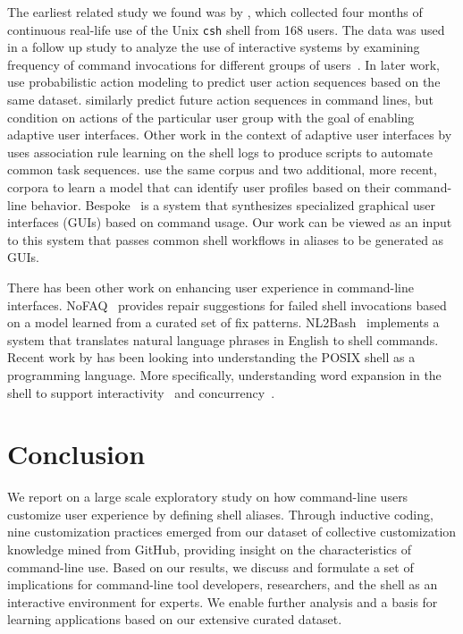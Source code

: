 \documentclass[smallextended,natbib]{svjour3}
\begin{document}
The earliest related study we found was by \cite{greenberg:88a}, which collected four months of continuous real-life use of the Unix \verb|csh| shell from 168 users. 
The data was used in a follow up study to analyze the use of interactive systems by examining frequency of command invocations for different groups of users~\citep{greenberg:88b}.
In later work, \cite{davison:98} use probabilistic action modeling to predict user action sequences based on the same dataset.
\cite{korvemaker:00} similarly predict future action sequences in command lines, but condition on actions of the particular user group with the goal of enabling adaptive user interfaces.
Other work in the context of adaptive user interfaces by \cite{jacobs:01} uses association rule learning on the shell logs to produce scripts to automate common task sequences.
\cite{khosmood:14} use the same corpus and two additional, more recent, corpora to learn a model that can identify user profiles based on their command-line behavior.
Bespoke~\citep{bespoke:19} is a system that synthesizes specialized graphical user interfaces (GUIs) based on command usage.
Our work can be viewed as an input to this system that passes common shell workflows in aliases to be generated as GUIs.

There has been other work on enhancing user experience in command-line interfaces.
NoFAQ~\citep{dantoni:17} provides repair suggestions for failed shell invocations based on a model learned from a curated set of fix patterns.
NL2Bash~\citep{lin:18} implements a system that translates natural language phrases in English to shell commands.
Recent work by \cite{greenberg:17} has been looking into understanding the POSIX shell as a programming language.
More specifically, understanding word expansion in the shell to support interactivity~\citep{greenberg:18a} and concurrency~\citep{greenberg:18b}.

\section{Conclusion}

We report on a large scale exploratory study on how command-line users customize user experience by defining shell aliases.
Through inductive coding, nine customization practices emerged from our dataset of collective customization knowledge mined from GitHub, providing insight on the characteristics of command-line use.
Based on our results, we discuss and formulate a set of implications for command-line tool developers, researchers, and the shell as an interactive environment for experts.
We enable further analysis and a basis for learning applications based on our extensive curated dataset.
\end{document}
